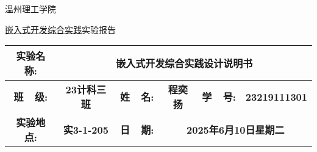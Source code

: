 \documentclass[9pt, a4paper]{article}
\begin{document}
{
  \centering
  \fontsize{20pt}{24pt}\selectfont 温州理工学院

  \fontsize{15pt}{30pt}\selectfont \underline{嵌入式开发综合实践}实验报告

  \begin{table}[H]
    \centering
    \fontsize{12pt}{14pt}\selectfont
    \begin{tabular}{|c|c|c|c|c|c|}
      \hline
      \textbf{实验名称:} & \multicolumn{5}{c|}{\textbf{嵌入式开发综合实践设计说明书}} \\
      \hline
      \textbf{班~~级:} & \textbf{23计科三班} & \textbf{姓~~名:} & \textbf{程奕扬} & \textbf{学~~号:} & \textbf{23219111301} \\
      \hline
      \textbf{实验地点:} & \textbf{实3-1-205} & \textbf{日~~期:} & \multicolumn{3}{c|}{\textbf{2025年6月10日星期二}} \\
      \hline
    \end{tabular}
  \end{table}
}

\raggedright












\end{document}
